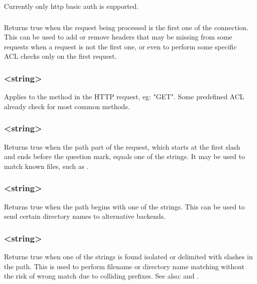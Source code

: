   Currently only http basic auth is supported.

\subsubsection[http\_first\_req]{}

  Returns true when the request being processed is the first one of the
  connection. This can be used to add or remove headers that may be missing
  from some requests when a request is not the first one, or even to perform
  some specific ACL checks only on the first request.

\subsubsection[method]{ <string>}

  Applies to the method in the HTTP request, eg: "GET". Some predefined ACL
  already check for most common methods.

\subsubsection[path]{ <string>}

  Returns true when the path part of the request, which starts at the first
  slash and ends before the question mark, equals one of the strings. It may be
  used to match known files, such as .

\subsubsection[path\_beg]{ <string>}

  Returns true when the path begins with one of the strings. This can be used
  to send certain directory names to alternative backends.

\subsubsection[path\_dir]{ <string>}

  Returns true when one of the strings is found isolated or delimited with
  slashes in the path. This is used to perform filename or directory name
  matching without the risk of wrong match due to colliding prefixes.
See also:    and .

